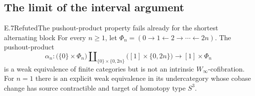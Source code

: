 \subsection{The limit of the interval argument}

\begin{result}{E.7}{Refuted}{The pushout-product property fails already for the shortest alternating block}
For every $n\geq1$, let $\Phi_n=(0\to1\leftarrow2\to\cdots\leftarrow2n)$. The pushout-product
\[
 \alpha_n:\bigl(\{0\}\times\Phi_n\bigr)
       \amalg_{\{0\}\times\{0,2n\}}
       \bigl([1]\times\{0,2n\}\bigr)
       \longrightarrow [1]\times\Phi_n
\]
is a weak equivalence of finite categories but is not an intrinsic $W_\infty$-cofibration. For $n=1$ there is an explicit weak equivalence in its undercategory whose cobase change has source contractible and target of homotopy type $S^3$.
\end{result}

